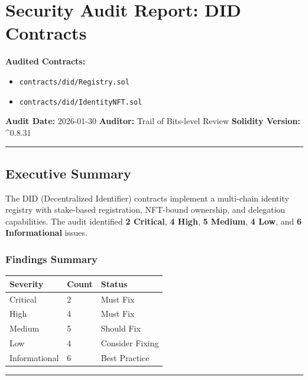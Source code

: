 \documentclass[
]{article}
\author{}
\date{}
\newcounter{none} %
\providecommand{\tightlist}{%
  \setlength{\itemsep}{0pt}\setlength{\parskip}{0pt}}
\begin{document}
\section{Security Audit Report: DID
Contracts}\label{security-audit-report-did-contracts}

\textbf{Audited Contracts:}

\begin{itemize}
\tightlist
\item
  \texttt{contracts/did/Registry.sol}
\item
  \texttt{contracts/did/IdentityNFT.sol}
\end{itemize}

\textbf{Audit Date:} 2026-01-30 \textbf{Auditor:} Trail of Bits-level
Review \textbf{Solidity Version:} \^{}0.8.31

\begin{center}\rule{0.5\linewidth}{0.5pt}\end{center}

\subsection{Executive Summary}\label{executive-summary}

The DID (Decentralized Identifier) contracts implement a multi-chain
identity registry with stake-based registration, NFT-bound ownership,
and delegation capabilities. The audit identified \textbf{2 Critical},
\textbf{4 High}, \textbf{5 Medium}, \textbf{4 Low}, and \textbf{6
Informational} issues.

\subsubsection{Findings Summary}\label{findings-summary}

{\def\LTcaptype{none} %
\begin{longtable}[]{@{}lll@{}}
\toprule\noalign{}
Severity & Count & Status \\
\midrule\noalign{}
\endhead
\bottomrule\noalign{}
\endlastfoot
Critical & 2 & Must Fix \\
High & 4 & Must Fix \\
Medium & 5 & Should Fix \\
Low & 4 & Consider Fixing \\
Informational & 6 & Best Practice \\
\end{longtable}
}

\begin{center}\rule{0.5\linewidth}{0.5pt}\end{center}
\end{document}
